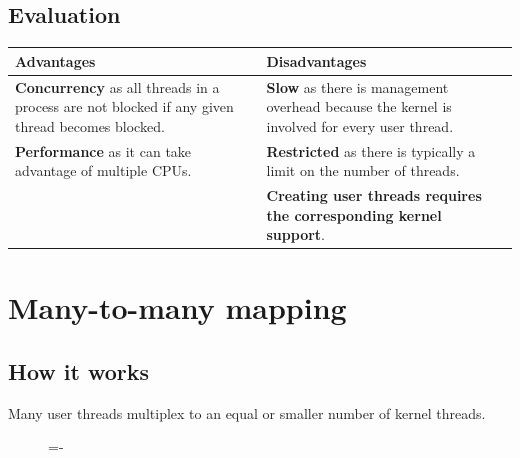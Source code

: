 \documentclass[a4paper]{systems-software}
\begin{document}
\subsection*{Evaluation}

\begin{longtabu} to \textwidth {|X[1,l]|X[1,l]|}
    \hline
    \textbf{Advantages} & \textbf{Disadvantages}
    \\ \hline
    \textbf{Concurrency} as all threads in a process are not blocked if any given thread becomes blocked.
    &
    \textbf{Slow} as there is management overhead because the kernel is involved for every user thread.
    \\ \hline
    \textbf{Performance} as it can take advantage of multiple CPUs.
    &
    \textbf{Restricted} as there is typically a limit on the number of threads.
	\\ \hline
    &
    \textbf{Creating user threads requires the corresponding kernel support}.
	\\ \hline
\end{longtabu}


\newpage

\section*{Many-to-many mapping}

\subsection*{How it works}

Many user threads multiplex to an equal or smaller number of kernel threads.

\begin{figure}[H]
  \lineskip=-\fboxrule
\end{figure}
\end{document}
